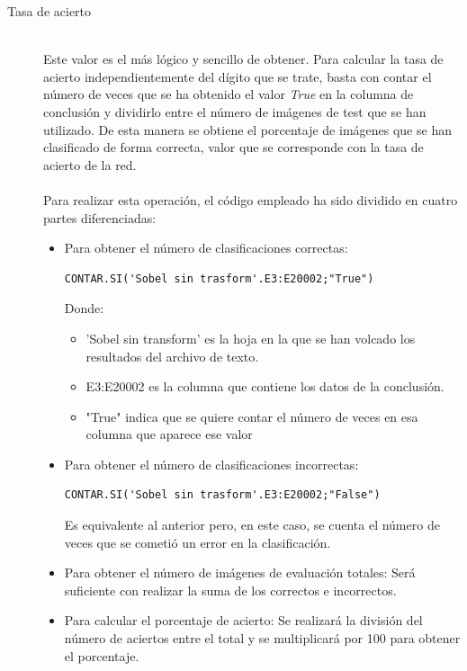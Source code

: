 \begin{description}
	\item[Tasa de acierto] \hfill 
	\vspace{5pt}
	\\
	Este valor es el más lógico y sencillo de obtener. Para calcular la tasa de acierto independientemente del dígito que se trate, basta con contar el número de veces que se ha obtenido el valor \textit{True} en la columna de conclusión y dividirlo entre el número de imágenes de test que se han utilizado. De esta manera se obtiene el porcentaje de imágenes que se han clasificado de forma correcta, valor que se corresponde con la tasa de acierto de la red.\\
	\vspace{-10pt}
	\\
	Para realizar esta operación, el código empleado ha sido dividido en cuatro partes diferenciadas:\\
	\vspace{-20pt}
	\begin{itemize}
		\item{Para obtener el número de clasificaciones correctas:
		\vspace{10pt}
		\begin{lstlisting}[frame=single]
			CONTAR.SI('Sobel sin trasform'.E3:E20002;"True")
		\end{lstlisting}
		Donde:
		\begin{itemize}
			\item 'Sobel sin transform' es la hoja en la que se han volcado los resultados del archivo de texto.
			\item E3:E20002 es la columna que contiene los datos de la conclusión.
			\item "True" indica que se quiere contar el número de veces en esa columna que aparece ese valor
		\end{itemize}
	}
	\item{Para obtener el número de clasificaciones incorrectas:
		\vspace{10pt}
		\begin{lstlisting}[frame=single]
			CONTAR.SI('Sobel sin trasform'.E3:E20002;"False")
		\end{lstlisting}
		Es equivalente al anterior pero, en este caso, se cuenta el número de veces que se cometió un error en la clasificación.
	}
	\item{Para obtener el número de imágenes de evaluación totales: Será suficiente con realizar la suma de los correctos e incorrectos.
	}
	\item{Para calcular el porcentaje de acierto: Se realizará la división del número de aciertos entre el total y se multiplicará por 100 para obtener el porcentaje.
}
\end{itemize}
\end{description}
